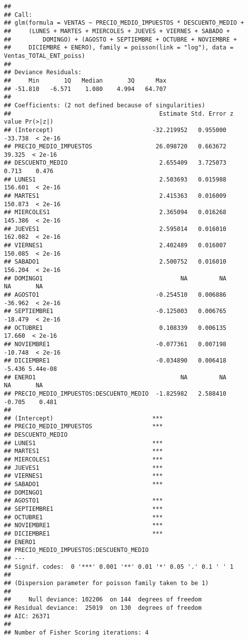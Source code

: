 \documentclass[
]{article}
\begin{document}
\begin{verbatim}
## 
## Call:
## glm(formula = VENTAS ~ PRECIO_MEDIO_IMPUESTOS * DESCUENTO_MEDIO + 
##     (LUNES + MARTES + MIERCOLES + JUEVES + VIERNES + SABADO + 
##         DOMINGO) + (AGOSTO + SEPTIEMBRE + OCTUBRE + NOVIEMBRE + 
##     DICIEMBRE + ENERO), family = poisson(link = "log"), data = Ventas_TOTAL_ENT_poiss)
## 
## Deviance Residuals: 
##     Min       1Q   Median       3Q      Max  
## -51.810   -6.571    1.080    4.994   64.707  
## 
## Coefficients: (2 not defined because of singularities)
##                                          Estimate Std. Error z value Pr(>|z|)
## (Intercept)                            -32.219952   0.955000 -33.738  < 2e-16
## PRECIO_MEDIO_IMPUESTOS                  26.098720   0.663672  39.325  < 2e-16
## DESCUENTO_MEDIO                          2.655409   3.725073   0.713    0.476
## LUNES1                                   2.503693   0.015988 156.601  < 2e-16
## MARTES1                                  2.415363   0.016009 150.873  < 2e-16
## MIERCOLES1                               2.365094   0.016268 145.386  < 2e-16
## JUEVES1                                  2.595014   0.016010 162.082  < 2e-16
## VIERNES1                                 2.402489   0.016007 150.085  < 2e-16
## SABADO1                                  2.500752   0.016010 156.204  < 2e-16
## DOMINGO1                                       NA         NA      NA       NA
## AGOSTO1                                 -0.254510   0.006886 -36.962  < 2e-16
## SEPTIEMBRE1                             -0.125003   0.006765 -18.479  < 2e-16
## OCTUBRE1                                 0.108339   0.006135  17.660  < 2e-16
## NOVIEMBRE1                              -0.077361   0.007198 -10.748  < 2e-16
## DICIEMBRE1                              -0.034890   0.006418  -5.436 5.44e-08
## ENERO1                                         NA         NA      NA       NA
## PRECIO_MEDIO_IMPUESTOS:DESCUENTO_MEDIO  -1.825982   2.588410  -0.705    0.481
##                                           
## (Intercept)                            ***
## PRECIO_MEDIO_IMPUESTOS                 ***
## DESCUENTO_MEDIO                           
## LUNES1                                 ***
## MARTES1                                ***
## MIERCOLES1                             ***
## JUEVES1                                ***
## VIERNES1                               ***
## SABADO1                                ***
## DOMINGO1                                  
## AGOSTO1                                ***
## SEPTIEMBRE1                            ***
## OCTUBRE1                               ***
## NOVIEMBRE1                             ***
## DICIEMBRE1                             ***
## ENERO1                                    
## PRECIO_MEDIO_IMPUESTOS:DESCUENTO_MEDIO    
## ---
## Signif. codes:  0 '***' 0.001 '**' 0.01 '*' 0.05 '.' 0.1 ' ' 1
## 
## (Dispersion parameter for poisson family taken to be 1)
## 
##     Null deviance: 102206  on 144  degrees of freedom
## Residual deviance:  25019  on 130  degrees of freedom
## AIC: 26371
## 
## Number of Fisher Scoring iterations: 4
\end{verbatim}
\end{document}
